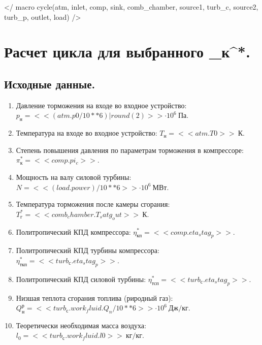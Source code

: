 </ macro cycle(atm, inlet, comp, sink, comb_chamber, source1, turb_c, source2, turb_p, outlet, load)  />


\section{Расчет цикла для выбранного \pi_к^*.}

\subsection{Исходные данные.}

\begin{enumerate}

	\item Давление торможения на входе во входное устройство: $p_{н} = << (atm.p0 / 10**6)|round(2) >> \cdot 10^6\ Па$.
	\item Температура на входе во входное устройство: $T_{н} = << atm.T0 >>\ К$.
	\item Степень повышения давления по параметрам торможения в компрессоре: $\pi_к^*= << comp.pi_c >>$.
	\item Мощность на валу силовой турбины: $ N = << (load.power)/ 10**6 >> \cdot 10^6\ МВт $.
	\item Температура торможения после камеры сгорания: $T_г^* = << comb_chamber.T_satg_out >>\ К$.
	\item Политропический КПД компрессора: $\eta^*_{к п} = << comp.eta_stag_p >> $.
	\item Политропический КПД турбины компрессора: $\eta^*_{ткп} = << turb_с.eta_stag_p >>$.
	\item Политропический КПД силовой турбины: $\eta^*_{тсп} = << turb_с.eta_stag_p >>$.
	\item Низшая теплота сгорания топлива (риродный газ): $Q^р_н = << turb_с.work_fluid.Q_n / 10**6>> \cdot 10^6\ Дж/кг$.
	\item Теоретически необходимая масса воздуха: $l_0 = << turb_с.work_fluid.l0 >>\ кг/кг$.


\end{enumerate}
